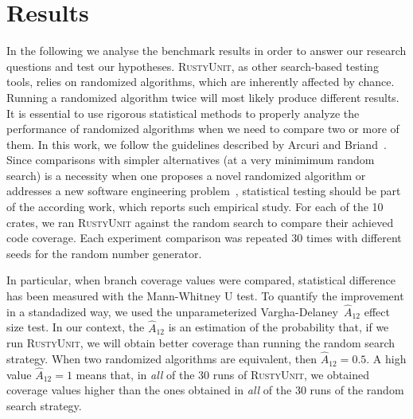 \documentclass[paper=a4,%
  twoside,%
  BCOR4mm,%
  abstract=true,%
  toc=bibliography,%
  chapterprefix=true,%
  toc=bibliographynumbered,%
  open=right,%
  english,%
  pagesize=pdftex]{scrreprt}
\newcommand{\benchnum}{10\xspace}
\newcommand{\tech}{\textsc{RustyUnit}\xspace}
\newcommand{\runs}{30\xspace}
\begin{document}
\section{Results}
\label{sec:results}
In the following we analyse the benchmark results in order to answer our research questions and test our hypotheses. \tech, as other search-based testing tools, relies on randomized algorithms, which are inherently affected by chance. Running a randomized algorithm twice will most likely produce different results. It is essential to use rigorous statistical methods to properly analyze the performance of randomized algorithms when we need to compare two or more of them. In this work, we follow the guidelines described by Arcuri and Briand~\cite{Arcuri2011}. Since comparisons with simpler alternatives (at a very minimimum random search) is a necessity when one proposes a novel randomized algorithm or addresses a new software engineering problem~\cite{Ali2010}, statistical testing should be part of the according work, which reports such empirical study. For each of the \benchnum crates, we ran \tech against the random search to compare their achieved code coverage. Each experiment comparison was repeated \runs times with different seeds for the random number generator.  %

In particular, when branch coverage values were compared, statistical difference has been measured with the Mann-Whitney U test. To quantify the improvement in a standadized way, we used the unparameterized Vargha-Delaney~$\hat{A}_{12}$ effect size test. In our context, the $\hat{A}_{12}$ is an estimation of the probability that, if we run \tech, we will obtain better coverage than running the random search strategy. When two randomized algorithms are equivalent, then $\hat{A}_{12} = 0.5$. A high value $\hat{A}_{12} = 1$ means that, in \emph{all} of the \runs runs of \tech, we obtained coverage values higher than the ones obtained in \emph{all} of the \runs runs of the random search strategy.
\end{document}
